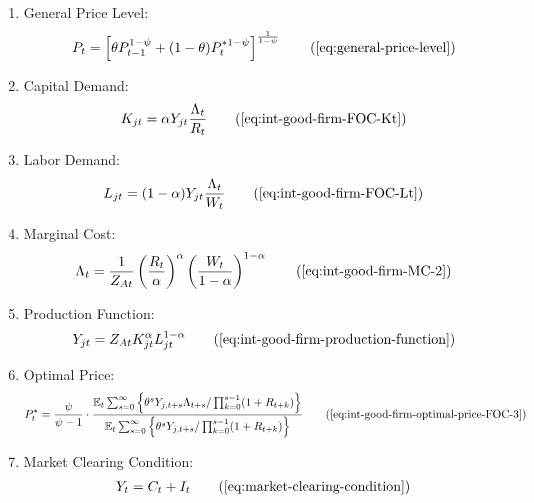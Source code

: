 \documentclass[
	12pt,
	]{article}
\numberwithin{equation}{section}
\newcommand{\E}[1][t]{{\mathbb{E}_{#1}}}
\theoremstyle{definition}
\theoremstyle{plain}
\theoremstyle{plain}
\theoremstyle{plain}
\begin{document}
{\begin{itemize}
\begin{enumerate}
	\item General Price Level:
	\begin{align}
		P_t = \left[ \theta P_{t-1}^{1-\psi} + (1-\theta) P_t^{\ast 1-\psi} \right]^\frac{1}{1-\psi}
		\tag{\ref{eq:general-price-level}}
	\end{align}
		
	\item Capital Demand:
	\begin{align}
		K_{jt} = \alpha Y_{jt} \frac{\Lambda_t}{R_t}
		\tag{\ref{eq:int-good-firm-FOC-Kt}}
	\end{align}
		
	\item Labor Demand:
	\begin{align}
		L_{jt} = (1-\alpha) Y_{jt} \frac{\Lambda_t}{W_t}
		\tag{\ref{eq:int-good-firm-FOC-Lt}}
	\end{align}
		
	
	\item Marginal Cost:
	\begin{align}
		\Lambda_t = \frac{1}{Z_{At}} \left( \frac{R_t}{\alpha} \right)^{\alpha} \left( \frac{W_t}{1-\alpha} \right)^{1-\alpha}
		\tag{\ref{eq:int-good-firm-MC-2}}
	\end{align}
			
	\item Production Function:
	\begin{align}
		Y_{jt} = Z_{At} K_{jt}^\alpha L_{jt}^{1-\alpha}
		\tag{\ref{eq:int-good-firm-production-function}}
	\end{align}
		
	\item Optimal Price:
	\begin{align}
		P_t^\ast = \frac{\psi}{\psi-1} \cdot \frac{ \E \sum_{s=0}^{\infty} \left\{ \theta^s Y_{j,t+s} \Lambda_{t+s} / \prod_{k=0}^{s-1}(1+R_{t+k}) \right\} } {\E \sum_{s=0}^{\infty} \left\{ \theta^s Y_{j,t+s} / \prod_{k=0}^{s-1}(1 + R_{t+k}) \right\}} \tag{\ref{eq:int-good-firm-optimal-price-FOC-3}}
	\end{align}
		
	\item Market Clearing Condition:
	\begin{align}
		Y_t = C_t + I_t
		\tag{\ref{eq:market-clearing-condition}}
	\end{align}
		

\end{enumerate}
\end{itemize}}
\end{document}
